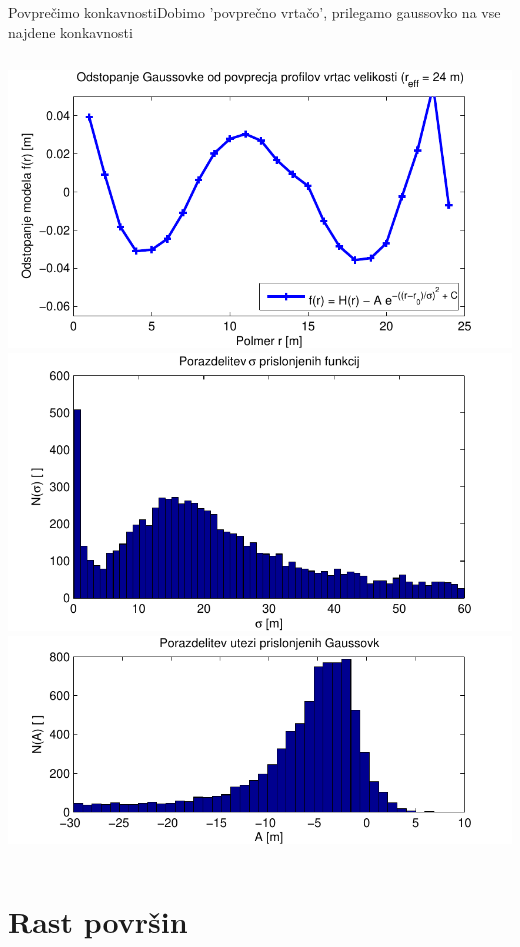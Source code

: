 \documentclass{beamer}
\begin{document}
\begin{frame}{Povprečimo konkavnosti}{Dobimo 'povprečno vrtačo', prilegamo gaussovko na vse najdene konkavnosti}
\begin{columns}
  \begin{column}{0.45\textwidth}
    \includegraphics[width=\textwidth]{slike/menisija-profil-21-fit} \\
    \includegraphics[width=\textwidth]{slike/menisija-sigme-hist} \\
    \includegraphics[width=\textwidth]{slike/menisija-globine-hist}
  \end{column}
\end{columns}

\end{frame}


\section{Rast površin}
\end{document}
